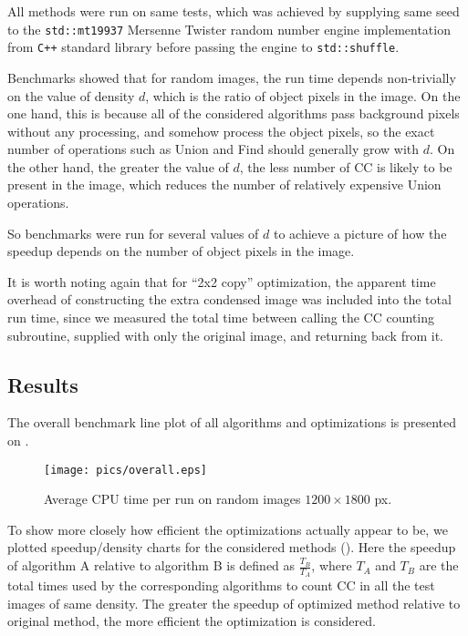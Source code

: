 \documentclass[hidelinks]{llncs}
\newcommand{\CXX}{\texttt{C++} \xspace}
\begin{document}
All methods were run on same tests, which was achieved by supplying same seed to
the \texttt{std::mt19937} Mersenne Twister\cite{mt19937} random number engine
implementation from \CXX standard library before passing the engine to
\texttt{std::shuffle}.

Benchmarks showed that for random images, the run time depends non-trivially on
the value of density $d$, which is the ratio of object pixels in the image. On
the one hand, this is because all of the considered algorithms pass background
pixels without any processing, and somehow process the object pixels, so the
exact number of operations such as Union and Find should generally grow with
$d$. On the other hand, the greater the value of $d$, the less number of CC is
likely to be present in the image, which reduces the number of relatively
expensive Union operations.

So benchmarks were run for several values of $d$ to achieve a picture of how the
speedup depends on the number of object pixels in the image.

It is worth noting again that for ``2x2 copy'' optimization, the apparent time
overhead of constructing the extra condensed image  was included into the total
run time, since we measured the total time between calling the CC counting
subroutine, supplied with only the original image, and returning back from
it.

\subsection{Results}

The overall benchmark line plot of all algorithms and optimizations is
presented on .

\begin{figure}
  \centering
  \texttt{[image: pics/overall.eps]}
  \caption{Average CPU time per run on random images $1200 \times 1800$ px.}
  \label{fig:overall}
\end{figure}

To show more closely how efficient the optimizations actually appear to be, we
plotted speedup/density charts for the considered methods ().
Here the speedup of algorithm A relative to algorithm B is defined as
$\frac{T_B}{T_A}$, where $T_A$ and $T_B$ are the total times used by the
corresponding algorithms to count CC in all the test images of same density.
The greater the speedup of optimized method relative to original method, the
more efficient the optimization is considered.
\end{document}
